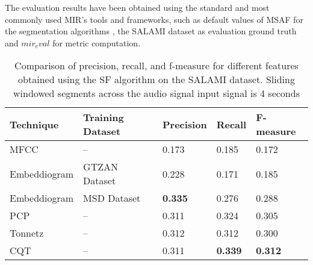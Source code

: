 
The evaluation results have been obtained using the standard and most commonly used MIR's tools and frameworks, such as default values of MSAF \cite{MSAF} for the segmentation algorithms \cite{sf}, the SALAMI dataset \cite{Smith2011DESIGNANNOTATIONS} as evaluation ground truth and $mir_eval$ \cite{RaffelMir_eval:METRICS} for metric computation.


\begin{table}[h]
\centering
\begin{tabularx}{\textwidth}{|X|X|X|X|X|}
\hline
\textbf{Technique} & \textbf{Training Dataset} & \textbf{Precision} & \textbf{Recall} & \textbf{F-measure} \\
\hline
MFCC & -- & 0.173 & 0.185 & 0.172 \\
\hline
Embeddiogram & GTZAN Dataset & 0.228 & 0.171 & 0.185 \\
\hline
Embeddiogram & MSD Dataset & \textbf{0.335} & 0.276 & 0.288 \\
\hline
PCP & -- & 0.311 & 0.324 & 0.305 \\
\hline
Tonnetz & -- & 0.312 & 0.312 & 0.300 \\
\hline
CQT & -- & 0.311 & \textbf{0.339} & \textbf{0.312} \\
\hline
\end{tabularx}
\caption[Metric comparison for different audio features]{Comparison of precision, recall, and f-measure for different features obtained using the SF algorithm \cite{sf} on the SALAMI dataset. Sliding windowed segments across the audio signal input signal is 4 seconds}
\label{tab:comparison}
\end{table}



